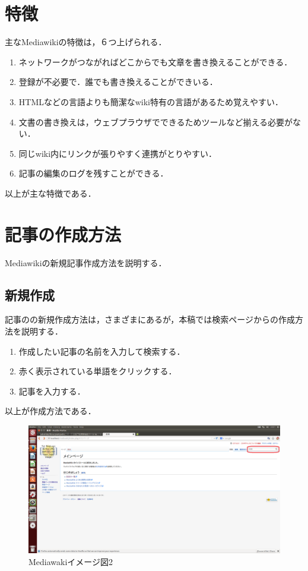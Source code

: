 \section{特徴}
主なMediawikiの特徴は，６つ上げられる．
\begin{enumerate}
\item ネットワークがつながればどこからでも文章を書き換えることができる．
\item 登録が不必要で．誰でも書き換えることができいる．
\item HTMLなどの言語よりも簡潔なwiki特有の言語があるため覚えやすい．
\item 文書の書き換えは，ウェブプラウザでできるためツールなど揃える必要がない．
\item 同じwiki内にリンクが張りやすく連携がとりやすい．
\item 記事の編集のログを残すことができる．
\end{enumerate}
以上が主な特徴である．

\section{記事の作成方法}
Mediawikiの新規記事作成方法を説明する．

\subsection{新規作成}
記事のの新規作成方法は，さまざまにあるが，本稿では検索ページからの作成方法を説明する．

\begin{enumerate}
\item 作成したい記事の名前を入力して検索する．
\item 赤く表示されている単語をクリックする．
\item 記事を入力する．
\end{enumerate}
以上が作成方法である．
\begin{figure}[htb]
\centering
\includegraphics[width=15cm]{kensaku}
\caption{Mediawakiイメージ図2}\label{図}
\end{figure}



